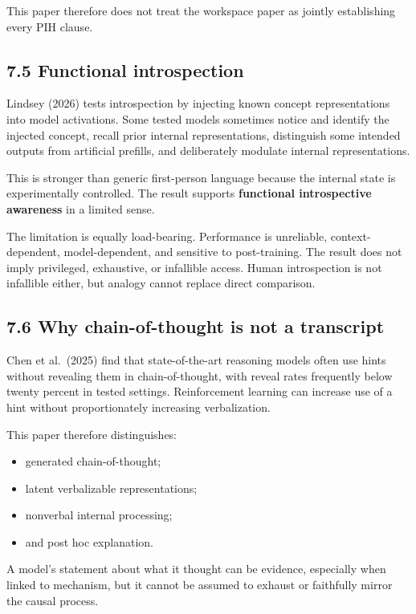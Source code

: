\documentclass[
  11pt,
]{article}
\providecommand{\tightlist}{%
  \setlength{\itemsep}{0pt}\setlength{\parskip}{0pt}}
\begin{document}
This paper therefore does not treat the workspace paper as jointly
establishing every PIH clause.

\subsection{7.5 Functional
introspection}\label{functional-introspection}

Lindsey (2026) tests introspection by injecting known concept
representations into model activations. Some tested models sometimes
notice and identify the injected concept, recall prior internal
representations, distinguish some intended outputs from artificial
prefills, and deliberately modulate internal representations.

This is stronger than generic first-person language because the internal
state is experimentally controlled. The result supports
\textbf{functional introspective awareness} in a limited sense.

The limitation is equally load-bearing. Performance is unreliable,
context-dependent, model-dependent, and sensitive to post-training. The
result does not imply privileged, exhaustive, or infallible access.
Human introspection is not infallible either, but analogy cannot replace
direct comparison.

\subsection{7.6 Why chain-of-thought is not a
transcript}\label{why-chain-of-thought-is-not-a-transcript}

Chen et al.~(2025) find that state-of-the-art reasoning models often use
hints without revealing them in chain-of-thought, with reveal rates
frequently below twenty percent in tested settings. Reinforcement
learning can increase use of a hint without proportionately increasing
verbalization.

This paper therefore distinguishes:

\begin{itemize}
\tightlist
\item
  generated chain-of-thought;
\item
  latent verbalizable representations;
\item
  nonverbal internal processing;
\item
  and post hoc explanation.
\end{itemize}

A model's statement about what it thought can be evidence, especially
when linked to mechanism, but it cannot be assumed to exhaust or
faithfully mirror the causal process.
\end{document}
